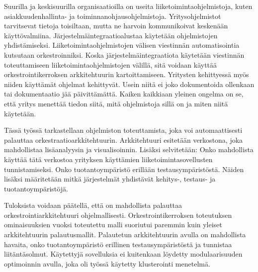 \documentclass[english, 12pt, a4paper, sci, utf8, a-2b, online, obeyspaces]{aaltothesis}
\begin{document}
\newpage
\begin{abstractpage}[finnish]
Suurilla ja keskisuurilla organisaatioilla on useita liiketoimintaohjelmistoja, kuten asiakkuudenhallinta- ja toiminnanohjausohjelmistoja. Yritysohjelmistot tarvitsevat tietoja toisiltaan, mutta ne harvoin kommunikoivat keskenään käyttövalmiina. Järjestelmäintegraatioalustaa käytetään ohjelmistojen yhdistämiseksi. Liiketoimintaohjelmistojen välisen viestinnän automatisointia kutsutaan orkestroinniksi. Koska järjestelmäintegraatiota käytetään viestinnän toteuttamiseen liiketoimintaohjelmistojen välillä, sitä voidaan käyttää orkestrointikerroksen arkkitehtuurin kartoittamiseen. Yritysten kehittyessä myös niiden käyttämät ohjelmat kehittyvät. Usein niitä ei joko dokumentoida ollenkaan tai dokumentaatio jää päivittämättä. Kaiken kaikkiaan yleinen ongelma on se, että yritys menettää tiedon siitä, mitä ohjelmistoja sillä on ja miten niitä käytetään.

Tässä työssä tarkastellaan ohjelmiston toteuttamista, joka voi automaattisesti palauttaa orkestraatioarkkitehtuurin. Arkkitehtuuri esitetään verkostona, joka mahdollistaa lisäanalyysin ja visualisoinnin. Lisäksi selvitetään: Onko mahdollista käyttää tätä verkostoa yrityksen käyttämien liiketoimintasovellusten tunnistamiseksi. Onko tuotantoympäristö erillään testausympäristöstä. Näiden lisäksi määritetään mitkä järjestelmät yhdistävät kehitys-, testaus- ja tuotantoympäristöjä.

Tuloksista voidaan päätellä, että on mahdollista palauttaa orkestrointiarkkitehtuuri ohjelmallisesti. Orkestrointikerroksen toteutuksen ominaisuuksien vuoksi toteutettu malli suoriutui paremmin kuin yleiset arkkitehtuurin palautusmallit. Palautetun arkkitehtuurin avulla on mahdollista havaita, onko tuotantoympäristö erillinen testausympäristöstä ja tunnistaa liitäntäsolmut. Käytettyjä sovelluksia ei kuitenkaan löydetty modulaarisuuden optimoinnin avulla, joka oli työssä käytetty klusterointi menetelmä.


\end{abstractpage}
\end{document}
